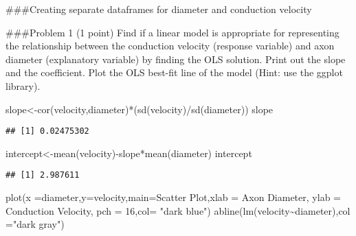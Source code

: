 \documentclass[
]{article}
\newenvironment{Shaded}{\begin{snugshade}}{\end{snugshade}}
\newcommand{\AttributeTok}[1]{\textcolor[rgb]{0.77,0.63,0.00}{#1}}
\newcommand{\DecValTok}[1]{\textcolor[rgb]{0.00,0.00,0.81}{#1}}
\newcommand{\FunctionTok}[1]{\textcolor[rgb]{0.00,0.00,0.00}{#1}}
\newcommand{\NormalTok}[1]{#1}
\newcommand{\OtherTok}[1]{\textcolor[rgb]{0.56,0.35,0.01}{#1}}
\newcommand{\SpecialCharTok}[1]{\textcolor[rgb]{0.00,0.00,0.00}{#1}}
\newcommand{\StringTok}[1]{\textcolor[rgb]{0.31,0.60,0.02}{#1}}
\begin{document}
\#\#\#Creating separate dataframes for diameter and conduction velocity

\begin{Shaded}
\end{Shaded}

\#\#\#Problem 1 (1 point) Find if a linear model is appropriate for
representing the relationship between the conduction velocity (response
variable) and axon diameter (explanatory variable) by finding the OLS
solution. Print out the slope and the coefficient. Plot the OLS best-fit
line of the model (Hint: use the ggplot library).

\begin{Shaded}
\begin{Highlighting}[]
\NormalTok{slope}\OtherTok{\textless{}{-}}\FunctionTok{cor}\NormalTok{(velocity,diameter)}\SpecialCharTok{*}\NormalTok{(}\FunctionTok{sd}\NormalTok{(velocity)}\SpecialCharTok{/}\FunctionTok{sd}\NormalTok{(diameter))}
\NormalTok{slope}
\end{Highlighting}
\end{Shaded}

\begin{verbatim}
## [1] 0.02475302
\end{verbatim}

\begin{Shaded}
\begin{Highlighting}[]
\NormalTok{intercept}\OtherTok{\textless{}{-}}\FunctionTok{mean}\NormalTok{(velocity)}\SpecialCharTok{{-}}\NormalTok{slope}\SpecialCharTok{*}\FunctionTok{mean}\NormalTok{(diameter)}
\NormalTok{intercept}
\end{Highlighting}
\end{Shaded}

\begin{verbatim}
## [1] 2.987611
\end{verbatim}

\begin{Shaded}
\begin{Highlighting}[]
\FunctionTok{plot}\NormalTok{(}\AttributeTok{x =}\NormalTok{diameter,}\AttributeTok{y=}\NormalTok{velocity,}\AttributeTok{main=}\StringTok{\textquotesingle{}Scatter Plot\textquotesingle{}}\NormalTok{,}\AttributeTok{xlab =} \StringTok{\textquotesingle{}Axon Diameter\textquotesingle{}}\NormalTok{, }\AttributeTok{ylab =} \StringTok{\textquotesingle{}Conduction Velocity\textquotesingle{}}\NormalTok{, }\AttributeTok{pch =} \DecValTok{16}\NormalTok{,}\AttributeTok{col=} \StringTok{"dark blue"}\NormalTok{)}
\FunctionTok{abline}\NormalTok{(}\FunctionTok{lm}\NormalTok{(velocity}\SpecialCharTok{\textasciitilde{}}\NormalTok{diameter),}\AttributeTok{col =}\StringTok{"dark gray"}\NormalTok{)}
\end{Highlighting}
\end{Shaded}
\end{document}
